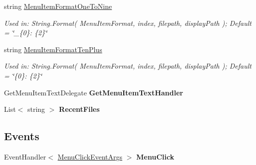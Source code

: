 \begin{DoxyCompactItemize}
\item 
string \hyperlink{class_power_system_planning_wpf_app_1_1_control_utils_1_1_recent_file_list_aae95e2ccda33122a193e35af9bf6aa0e}{Menu\+Item\+Format\+One\+To\+Nine}
\begin{DoxyCompactList}\small\item\em Used in\+: String.\+Format( Menu\+Item\+Format, index, filepath, display\+Path ); Default = \char`\"{}\+\_\+\{0\}\+:  \{2\}\char`\"{} \end{DoxyCompactList}\item 
string \hyperlink{class_power_system_planning_wpf_app_1_1_control_utils_1_1_recent_file_list_a27d7ee892ff4ad876fcee4e8b6f7c076}{Menu\+Item\+Format\+Ten\+Plus}
\begin{DoxyCompactList}\small\item\em Used in\+: String.\+Format( Menu\+Item\+Format, index, filepath, display\+Path ); Default = \char`\"{}\{0\}\+:  \{2\}\char`\"{} \end{DoxyCompactList}\item 
Get\+Menu\+Item\+Text\+Delegate {\bfseries Get\+Menu\+Item\+Text\+Handler}\hypertarget{class_power_system_planning_wpf_app_1_1_control_utils_1_1_recent_file_list_a0541e623b6977a2672c5a6e54d8af2b4}{}\label{class_power_system_planning_wpf_app_1_1_control_utils_1_1_recent_file_list_a0541e623b6977a2672c5a6e54d8af2b4}

\item 
List$<$ string $>$ {\bfseries Recent\+Files}\hypertarget{class_power_system_planning_wpf_app_1_1_control_utils_1_1_recent_file_list_ab646cd45024c3a96574b90db7114e23a}{}\label{class_power_system_planning_wpf_app_1_1_control_utils_1_1_recent_file_list_ab646cd45024c3a96574b90db7114e23a}

\end{DoxyCompactItemize}
\subsection*{Events}
\begin{DoxyCompactItemize}
\item 
Event\+Handler$<$ \hyperlink{class_power_system_planning_wpf_app_1_1_control_utils_1_1_recent_file_list_1_1_menu_click_event_args}{Menu\+Click\+Event\+Args} $>$ {\bfseries Menu\+Click}\hypertarget{class_power_system_planning_wpf_app_1_1_control_utils_1_1_recent_file_list_ad5108b19820ca3c4d54534f739b36ade}{}\label{class_power_system_planning_wpf_app_1_1_control_utils_1_1_recent_file_list_ad5108b19820ca3c4d54534f739b36ade}

\end{DoxyCompactItemize}


